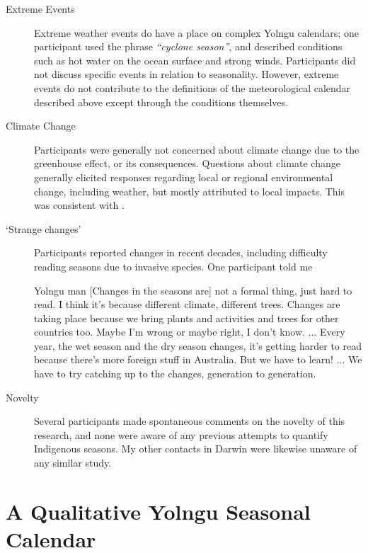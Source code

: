 \begin{description}
\item[Extreme Events]
    Extreme weather events do have a place on complex Yolngu calendars;
    one participant used the phrase \textsl{``cyclone season''}, and described
    conditions such as hot water on the ocean surface and strong winds.
    Participants did not discuss specific events in relation to seasonality.
    However, extreme events do not contribute to the definitions of the
    meteorological calendar described above except through the conditions
    themselves.

\item[Climate Change]
    Participants were generally not concerned about climate change due to
    the greenhouse effect, or its consequences.  Questions about climate
    change generally elicited responses regarding local or regional
    environmental change, including weather, but mostly attributed to
    local impacts.  This was consistent with \citet{petheram2010}.

\item[`Strange changes']
    Participants reported changes in recent decades, including difficulty
    reading seasons due to invasive species.  One participant told me
    \begin{pquote}{Yolngu man}
    [Changes in the seasons are] not a formal thing, just hard to read.
    I think it's because different climate, different trees.  Changes are
    taking place because we bring plants and activities and trees for
    other countries too.  Maybe I'm wrong or maybe right, I don't know.
    ...
    Every year, the wet season and the dry season changes, it's getting
    harder to read because there's more foreign stuff in Australia.
    But we have to learn! ... We have to try catching up to the changes,
    generation to generation.
    \end{pquote}

\item[Novelty]
    Several participants made spontaneous comments on the novelty of this
    research, and none were aware of any previous attempts to quantify
    Indigenous seasons.  My other contacts in Darwin were likewise unaware
    of any similar study.
\end{description}



\section{A Qualitative Yolngu Seasonal Calendar}
\label{sec:calendar-description}

